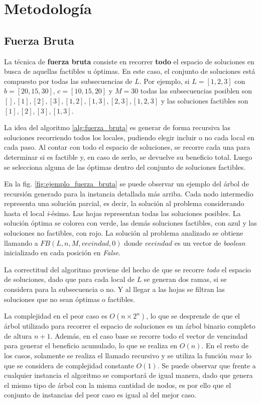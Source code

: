 \section{Metodología}\label{metodologia}

\subsection{Fuerza Bruta}

La técnica de \textbf{fuerza bruta} consiste en recorrer \textbf{todo} el espacio de soluciones en busca de aquellas factibles u óptimas. En este caso, el conjunto de soluciones está compuesto por todas las subsecuencias de $L$. Por ejemplo, si $L=[1,2,3]$ con $b=[20,15,30]$, $c=[10, 15, 20]$ y $M=30$ todas las subsecuencias posiblen son $[], [1], [2], [3], [1,2], [1,3], [2,3], [1,2,3]$ y las soluciones factibles son $[1], [2], [3], [1,3]$.

La idea del algoritmo \ref{alg:fuerza_bruta} es generar de forma recursiva las soluciones recorriendo todos los locales, pudiendo elegir incluir o no cada local en cada paso. Al contar con todo el espacio de soluciones, se recorre cada una para determinar si es factible y, en caso de serlo, se devuelve su beneficio total. Luego se selecciona alguna de las óptimas dentro del conjunto de soluciones factibles.

En la fig. \ref{fig:ejemplo_fuerza_bruta} se puede observar un ejemplo del árbol de recursión generado para la instancia detallada más arriba. Cada nodo intermedio representa una solución parcial, es decir, la solución al problema considerando hasta el local \textit{i}-ésimo. Las hojas representan todas las soluciones posibles. La solución óptima se colorea con verde, las demás soluciones factibles, con azul y las soluciones no factibles, con rojo. La solución al problema analizado se obtiene llamando a $FB(L, n, M, vecindad, 0)$ donde $vecindad$ es un vector de \textit{boolean} inicializado en cada posición en \textit{False}.

La correctitud del algoritmo proviene del hecho de que se recorre \textit{todo} el espacio de soluciones, dado que para cada local de $L$ se generan dos ramas, si se considera para la subsecuencia o no. Y al llegar a las hojas se filtran las soluciones que no sean óptimas o factibles.

La complejidad en el peor caso es $O(n\times2^n)$, lo que se desprende de que el árbol utilizado para recorrer el espacio de soluciones es un árbol binario completo de altura $n+1$. Además, en el caso base se recorre todo el vector de vencindad para generar el beneficio acumulado, lo que se realiza en $O(n)$. En el resto de los casos, solamente se realiza el llamado recursivo y se utiliza la función $max$ lo que se considera de complejidad constante $O(1)$. Se puede observar que frente a cualquier instancia el algoritmo se comportará de igual manera, dado que genera el mismo tipo de árbol con la misma cantidad de nodos, es por ello que el conjunto de instancias del peor caso es igual al del mejor caso.

